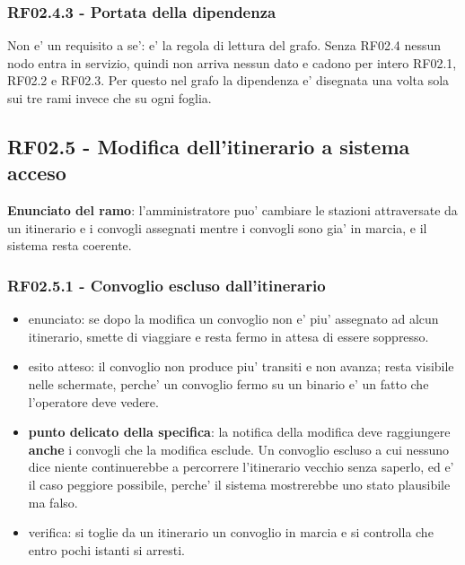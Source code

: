 \documentclass[11pt]{article}
\begin{document}
\subsubsection{RF02.4.3 - Portata della dipendenza}
\label{sec:org3d22f4a}
Non e' un requisito a se': e' la regola di lettura del grafo. Senza RF02.4 nessun nodo entra in
servizio, quindi non arriva nessun dato e cadono per intero RF02.1, RF02.2 e RF02.3. Per questo nel
grafo la dipendenza e' disegnata una volta sola sui tre rami invece che su ogni foglia.
\subsection{RF02.5 - Modifica dell'itinerario a sistema acceso}
\label{sec:orgc50b538}

\textbf{Enunciato del ramo}: l'amministratore puo' cambiare le stazioni attraversate da un itinerario e i
convogli assegnati mentre i convogli sono gia' in marcia, e il sistema resta coerente.
\subsubsection{RF02.5.1 - Convoglio escluso dall'itinerario}
\label{sec:orgc4a5fe7}
\begin{itemize}
\item enunciato: se dopo la modifica un convoglio non e' piu' assegnato ad alcun itinerario, smette di
viaggiare e resta fermo in attesa di essere soppresso.
\item esito atteso: il convoglio non produce piu' transiti e non avanza; resta visibile nelle schermate,
perche' un convoglio fermo su un binario e' un fatto che l'operatore deve vedere.
\item \textbf{punto delicato della specifica}: la notifica della modifica deve raggiungere \textbf{anche} i convogli
che la modifica esclude. Un convoglio escluso a cui nessuno dice niente continuerebbe a percorrere
l'itinerario vecchio senza saperlo, ed e' il caso peggiore possibile, perche' il sistema mostrerebbe
uno stato plausibile ma falso.
\item verifica: si toglie da un itinerario un convoglio in marcia e si controlla che entro pochi istanti
si arresti.
\end{itemize}
\end{document}
